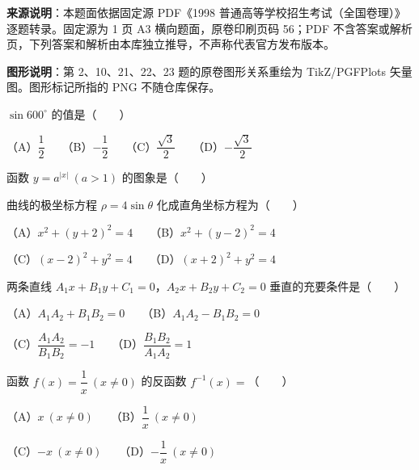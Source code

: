 


\begin{gktip}
\textbf{来源说明}：本题面依据固定源 PDF《1998 普通高等学校招生考试（全国卷理）》逐题转录。固定源为 1 页 A3 横向题面，原卷印刷页码 56；PDF 不含答案或解析页，下列答案和解析由本库独立推导，不声称代表官方发布版本。

\textbf{图形说明}：第 2、10、21、22、23 题的原卷图形关系重绘为 TikZ/PGFPlots 矢量图。图形标记所指的 PNG 不随仓库保存。
\end{gktip}

\begin{question}
$\sin600^\circ$ 的值是\mbox{（　　）}

（A）$\dfrac12$　　（B）$-\dfrac12$　　（C）$\dfrac{\sqrt3}{2}$　　（D）$-\dfrac{\sqrt3}{2}$

\Needspace{0.4\textheight}
\end{question}
\begin{question}
函数 $y=a^{|x|}\ (a>1)$ 的图象是\mbox{（　　）}
\nopagebreak[4]
\begin{center}\end{center}
\nopagebreak[4]
\end{question}
\begin{question}
曲线的极坐标方程 $\rho=4\sin\theta$ 化成直角坐标方程为\mbox{（　　）}

（A）$x^2+(y+2)^2=4$　　（B）$x^2+(y-2)^2=4$

（C）$(x-2)^2+y^2=4$　　（D）$(x+2)^2+y^2=4$

\end{question}
\begin{question}
两条直线 $A_1x+B_1y+C_1=0$，$A_2x+B_2y+C_2=0$ 垂直的充要条件是\mbox{（　　）}

（A）$A_1A_2+B_1B_2=0$　　（B）$A_1A_2-B_1B_2=0$

（C）$\dfrac{A_1A_2}{B_1B_2}=-1$　　（D）$\dfrac{B_1B_2}{A_1A_2}=1$

\end{question}
\begin{question}
函数 $f(x)=\dfrac1x\ (x\neq0)$ 的反函数 $f^{-1}(x)=$\mbox{（　　）}

（A）$x\ (x\neq0)$　　（B）$\dfrac1x\ (x\neq0)$

（C）$-x\ (x\neq0)$　　（D）$-\dfrac1x\ (x\neq0)$

\end{question}

